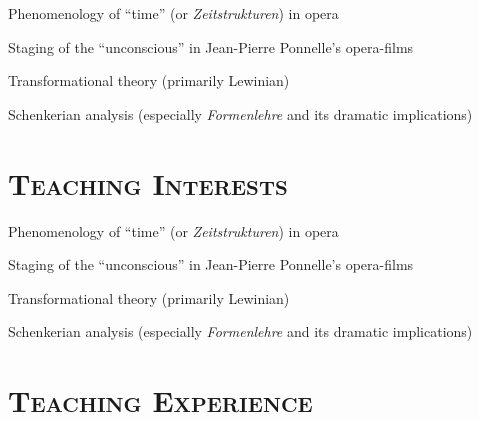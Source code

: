 \documentclass[a4,11pt,draft]{article}
\begin{document}
  \hspace{2mm} \textbullet \hspace{2mm} Phenomenology of ``time'' (or \textit{Zeitstrukturen}) in opera
  
  
  \noindent \hspace{2mm} \textbullet \hspace{2mm} Staging of the ``unconscious'' in Jean-Pierre Ponnelle's opera-films
  
  \noindent \hspace{2mm} \textbullet \hspace{2mm} Transformational theory (primarily Lewinian)
  
  \noindent \hspace{2mm} \textbullet \hspace{2mm} Schenkerian analysis (especially \textit{Formenlehre} and its dramatic implications)
  
  \section*{\textsc{Teaching Interests}}
  
  \hspace{2mm} \textbullet \hspace{2mm} Phenomenology of ``time'' (or \textit{Zeitstrukturen}) in opera
  
  
  \noindent \hspace{2mm} \textbullet \hspace{2mm} Staging of the ``unconscious'' in Jean-Pierre Ponnelle's opera-films
  
  \noindent \hspace{2mm} \textbullet \hspace{2mm} Transformational theory (primarily Lewinian)
  
  \noindent \hspace{2mm} \textbullet \hspace{2mm} Schenkerian analysis (especially \textit{Formenlehre} and its dramatic implications)
  
  \section*{\textsc{Teaching Experience}}
  
\end{document}
